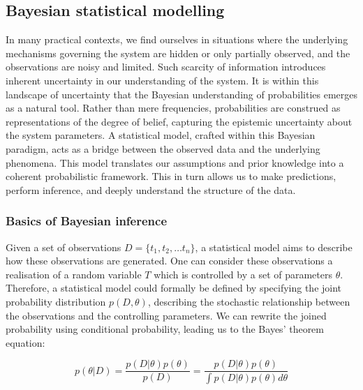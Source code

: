 \subsection{Bayesian statistical modelling}
\label{sec:bayesian-intro}

In many practical contexts, we find ourselves in situations where the underlying mechanisms governing the system are hidden or only partially observed, and the observations are noisy and limited. Such scarcity of information introduces inherent uncertainty in our understanding of the system. It is within this landscape of uncertainty that the Bayesian understanding of probabilities emerges as a natural tool. Rather than mere frequencies, probabilities are construed as representations of the degree of belief, capturing the epistemic uncertainty about the system parameters. A statistical model, crafted within this Bayesian paradigm, acts as a bridge between the observed data and the underlying phenomena. This model translates our assumptions and prior knowledge into a coherent probabilistic framework. This in turn allows us to make predictions, perform inference, and deeply understand the structure of the data.

\subsubsection*{Basics of Bayesian inference}
Given a set of observations ${D} = \{t_1, t_2, … t_n\}$, a statistical model aims to describe how these observations are generated. One can consider these observations a realisation of a random variable $T$ which is controlled by a set of parameters $\theta$. Therefore, a statistical model could formally be defined by specifying the joint probability distribution $p({D}, \theta)$, describing the stochastic relationship between the observations and the controlling parameters. We can rewrite the joined probability using conditional probability, leading us to the Bayes' theorem equation:

\begin{equation}
p(\theta | {D}) = \frac{p({D} | \theta) p(\theta)}{p({D})} = \frac{p({D} | \theta) p(\theta)}{\int p({D} | \theta) p(\theta) d\theta}
\end{equation}

